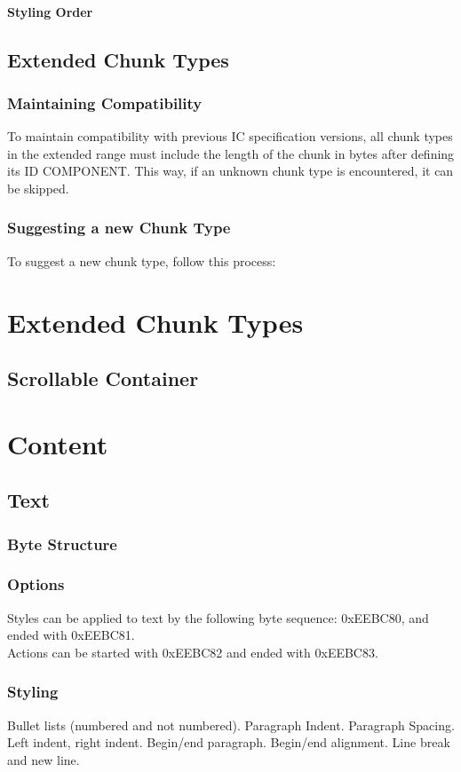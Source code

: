 \documentclass{report}
\begin{document}
\subsubsection{Styling Order}

\section{Extended Chunk Types}
\subsection{Maintaining Compatibility}
To maintain compatibility with previous IC specification versions, all chunk types in the extended range must include the length of the chunk in bytes after defining its ID COMPONENT. This way, if an unknown chunk type is encountered, it can be skipped.
\subsection{Suggesting a new Chunk Type}
To suggest a new chunk type, follow this process:

\chapter{Extended Chunk Types}
\section{Scrollable Container}

\chapter{Content}
\section{Text}
\subsection{Byte Structure}
\subsection{Options}
Styles can be applied to text by the following byte sequence: 0xEEBC80, and ended with 0xEEBC81.\\
Actions can be started with 0xEEBC82 and ended with 0xEEBC83.
\subsection{Styling}
Bullet lists (numbered and not numbered). Paragraph Indent. Paragraph Spacing. Left indent, right indent. Begin/end paragraph. Begin/end alignment. Line break and new line.
\end{document}

